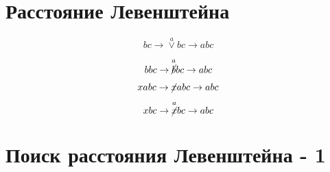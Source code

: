 \documentclass[24pt,pdf,hyperref={unicode},aspectratio=169]{beamer}
\begin{document}
\section{Расстояние Левенштейна}

\begin{frame}
$$
bc \rightarrow \overset{a}{\vee}bc \rightarrow abc
$$ 

$$
bbc \rightarrow \overset{a}{\cancel{b}}bc \rightarrow abc
$$

$$
xabc \rightarrow \cancel{x}abc \rightarrow abc
$$

$$
xbc \rightarrow \overset{a}{\cancel{x}}bc\rightarrow abc
$$

\end{frame}

\section{Поиск расстояния Левенштейна - 1}
\end{document}
